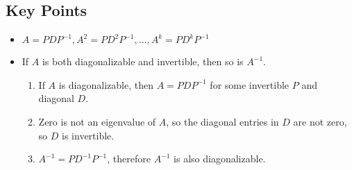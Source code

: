 \documentclass{article}
\begin{document}
\subsection*{Key Points}
\begin{itemize}
    \item $A=PDP^{-1}, A^2 = PD^2 P^{-1}, \ldots, A^k=PD^k P^{-1}$
    \item If $A$ is both diagonalizable and invertible, then so is $A^{-1}$.
        \begin{enumerate}
            \item If $A$ is diagonalizable, then $A=PDP^{-1}$ for some invertible $P$ and diagonal
            $D$.
            \item Zero is not an eigenvalue of $A$, so the diagonal entries in $D$ are not zero, so
            $D$ is invertible.
            \item $A^{-1}=PD^{-1}P^{-1}$, therefore $A^{-1}$ is also diagonalizable.
        \end{enumerate}
\end{itemize}
\end{document}
